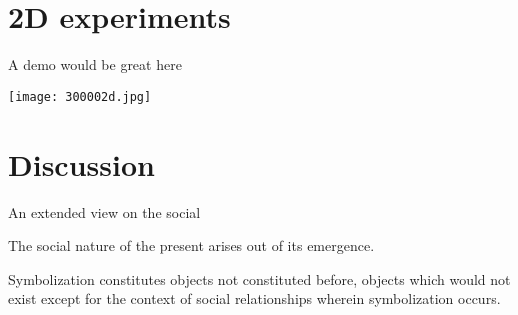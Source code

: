 \part{2D experiments}
\frame{\partpage}

\begin{frame}{A demo would be great here}{}
\begin{center}
\texttt{[image: 300002d.jpg]}
\end{center}
\end{frame}

\part{Discussion}
\frame{\partpage}

\begin{frame}{An extended view on the social}{}
{\small The social nature of the present arises out of its emergence.

\medskip



Symbolization constitutes objects not constituted before, objects which would not exist except for the context of social relationships wherein symbolization occurs.
} \qquad\qquad {}
\end{frame}


